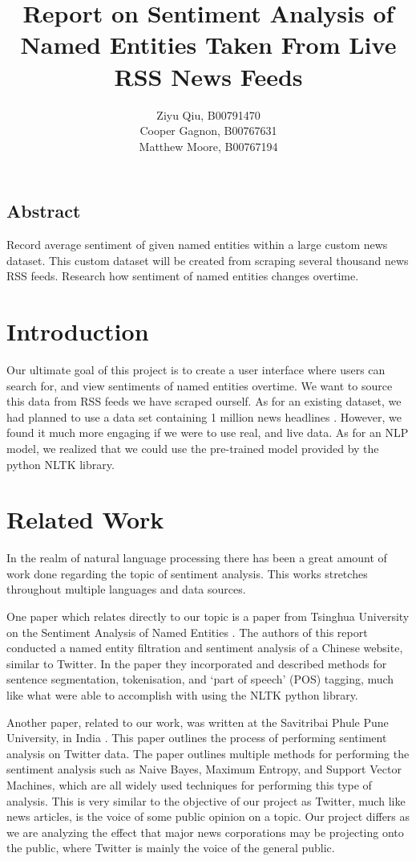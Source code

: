 \documentclass[12pt]{article}
\title{Report on Sentiment Analysis of Named Entities Taken From Live RSS News Feeds}
\author{Ziyu Qiu, B00791470 \\ Cooper Gagnon, B00767631 \\ Matthew Moore, B00767194}
\begin{document}
\maketitle

\begin{center}
    \section*{Abstract}
    Record average sentiment of given named entities within a large custom news dataset. This custom dataset will be created from scraping several thousand news RSS feeds. Research how sentiment of named entities changes overtime. \\
\end{center}
\newpage
\section{Introduction}
\setlength{\parindent}{5ex}
Our ultimate goal of this project is to create a user interface where users can search for, and view sentiments of named entities overtime. We want to source this data from RSS feeds we have scraped ourself. As for an existing dataset, we had planned to use a data set containing 1 million news headlines \cite{Kaggle}. However, we found it much more engaging if we were to use real, and live data. As for an NLP model, we realized that we could use the pre-trained model provided by the python NLTK library. \\

\section{Related Work}
\hspace{\parindent} In the realm of natural language processing there has been a great amount of work done regarding the topic of sentiment analysis. This works stretches throughout multiple languages and data sources. 

One paper which relates directly to our topic is a paper from Tsinghua University on the Sentiment Analysis of Named Entities \cite{Wangx}. The authors of this report conducted a named entity filtration and sentiment analysis of a Chinese website, similar to Twitter. In the paper they incorporated and described methods for sentence segmentation, tokenisation, and `part of speech' (POS) tagging, much like what were able to accomplish with using the NLTK python library. 

Another paper, related to our work, was written at the Savitribai Phule Pune University, in India \cite{Sahayakv}. This paper outlines the process of performing sentiment analysis on Twitter data. The paper outlines multiple methods for performing the sentiment analysis such as Naive Bayes, Maximum Entropy, and Support Vector Machines, which are all widely used techniques for performing this type of analysis. This is very similar to the objective of our project as Twitter, much like news articles, is the voice of some public opinion on a topic. Our project differs as we are analyzing the effect that major news corporations may be projecting onto the public, where Twitter is mainly the voice of the general public. 
\end{document}
